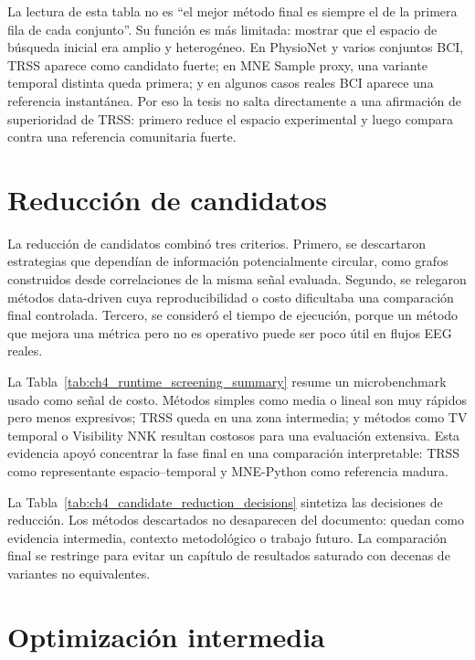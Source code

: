 

La lectura de esta tabla no es “el mejor método final es siempre el de la primera fila de cada conjunto”. Su función es más limitada: mostrar que el espacio de búsqueda inicial era amplio y heterogéneo. En PhysioNet y varios conjuntos BCI, TRSS aparece como candidato fuerte; en MNE Sample proxy, una variante temporal distinta queda primera; y en algunos casos reales BCI aparece una referencia instantánea. Por eso la tesis no salta directamente a una afirmación de superioridad de TRSS: primero reduce el espacio experimental y luego compara contra una referencia comunitaria fuerte.

\section{Reducción de candidatos}

La reducción de candidatos combinó tres criterios. Primero, se descartaron estrategias que dependían de información potencialmente circular, como grafos construidos desde correlaciones de la misma señal evaluada. Segundo, se relegaron métodos data-driven cuya reproducibilidad o costo dificultaba una comparación final controlada. Tercero, se consideró el tiempo de ejecución, porque un método que mejora una métrica pero no es operativo puede ser poco útil en flujos EEG reales.

La Tabla~\ref{tab:ch4_runtime_screening_summary} resume un microbenchmark usado como señal de costo. Métodos simples como media o lineal son muy rápidos pero menos expresivos; TRSS queda en una zona intermedia; y métodos como TV temporal o Visibility NNK resultan costosos para una evaluación extensiva. Esta evidencia apoyó concentrar la fase final en una comparación interpretable: TRSS como representante espacio--temporal y MNE-Python como referencia madura.



La Tabla~\ref{tab:ch4_candidate_reduction_decisions} sintetiza las decisiones de reducción. Los métodos descartados no desaparecen del documento: quedan como evidencia intermedia, contexto metodológico o trabajo futuro. La comparación final se restringe para evitar un capítulo de resultados saturado con decenas de variantes no equivalentes.



\section{Optimización intermedia}

